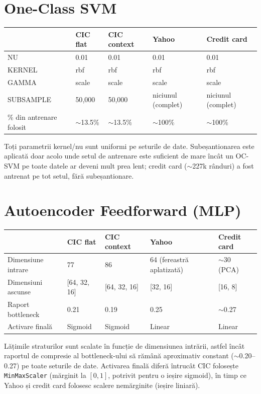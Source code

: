 \section{One-Class SVM}

\begin{center}
\begin{tabular}{@{}lllll@{}}
\toprule
 & CIC flat & CIC context & Yahoo & Credit card \\
\midrule
NU & 0.01 & 0.01 & 0.01 & 0.01 \\
KERNEL & rbf & rbf & rbf & rbf \\
GAMMA & scale & scale & scale & scale \\
SUBSAMPLE & 50{,}000 & 50{,}000 & niciunul (complet) & niciunul (complet) \\
\% din antrenare folosit & $\sim$13.5\% & $\sim$13.5\% & $\sim$100\% & $\sim$100\% \\
\bottomrule
\end{tabular}
\end{center}

Toți parametrii kernel/nu sunt uniformi pe seturile de date. Subeșantionarea este aplicată doar acolo unde setul de antrenare este suficient de mare încât un OC-SVM pe toate datele ar deveni mult prea lent; credit card ($\sim$227k rânduri) a fost antrenat pe tot setul, fără subeșantionare.

\section{Autoencoder Feedforward (MLP)}

\begin{center}
\begin{tabular}{@{}lllll@{}}
\toprule
 & CIC flat & CIC context & Yahoo & Credit card \\
\midrule
Dimensiune intrare & 77 & 86 & 64 (fereastră aplatizată) & $\sim$30 (PCA) \\
Dimensiuni ascunse & [64, 32, 16] & [64, 32, 16] & [32, 16] & [16, 8] \\
Raport bottleneck & 0.21 & 0.19 & 0.25 & $\sim$0.27 \\
Activare finală & Sigmoid & Sigmoid & Linear & Linear \\
\bottomrule
\end{tabular}
\end{center}

Lățimile straturilor sunt scalate în funcție de dimensiunea intrării, astfel încât raportul de compresie al bottleneck-ului să rămână aproximativ constant ($\sim$0.20--0.27) pe toate seturile de date. Activarea finală diferă întrucât CIC folosește \texttt{MinMaxScaler} (mărginit la $[0,1]$, potrivit pentru o ieșire sigmoid), în timp ce Yahoo și credit card folosesc scalere nemărginite (ieșire liniară).

